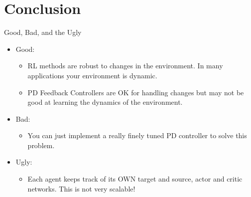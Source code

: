 \documentclass[9pt]{beamer}
\begin{document}
\section{Conclusion}
\begin{frame}{Good, Bad, and the Ugly}
	\begin{itemize}
		\item Good:
		\begin{itemize}
			\item RL methods are robust to changes in the environment. In many applications your environment is dynamic. 
			\item PD Feedback Controllers are OK for handling changes but may not be good at learning the dynamics of the environment. 
		\end{itemize}
		\item Bad:
		\begin{itemize}
			\item You can just implement a really finely tuned PD controller to solve this problem.
		\end{itemize}
		\item Ugly:
		\begin{itemize}
			\item Each agent keeps track of its OWN target and source, actor and critic networks. This is not very scalable!  
		\end{itemize}
	\end{itemize}
\end{frame}
\end{document}
